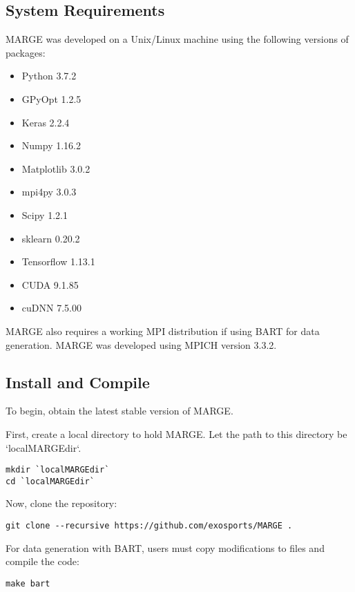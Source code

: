 \documentclass[letterpaper, 12pt]{article}
\begin{document}
\subsection{System Requirements}
\label{sec:requirements}

\noindent MARGE was developed on a Unix/Linux machine using the following 
versions of packages:

\begin{itemize}
\item Python 3.7.2
\item GPyOpt 1.2.5
\item Keras 2.2.4
\item Numpy 1.16.2
\item Matplotlib 3.0.2
\item mpi4py 3.0.3
\item Scipy 1.2.1
\item sklearn 0.20.2
\item Tensorflow 1.13.1
\item CUDA 9.1.85
\item cuDNN 7.5.00
\end{itemize}

\noindent MARGE also requires a working MPI distribution if using BART for 
data generation.  MARGE was developed using MPICH version 3.3.2.



\subsection{Install and Compile}
\label{sec:install}

\noindent To begin, obtain the latest stable version of MARGE.  

\noindent First, create a local directory to hold MARGE.  Let the path to this directory 
be `localMARGEdir`.

\begin{verbatim}
mkdir `localMARGEdir`
cd `localMARGEdir`
\end{verbatim}

\noindent Now, clone the repository:
\begin{verbatim}
git clone --recursive https://github.com/exosports/MARGE .
\end{verbatim}

\noindent For data generation with BART, users must copy modifications to files
and compile the code:

\begin{verbatim}
make bart
\end{verbatim}
\end{document}

